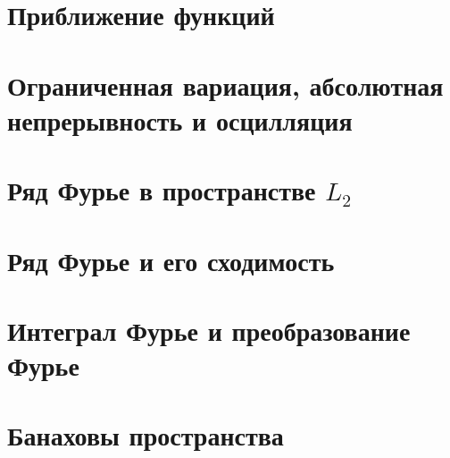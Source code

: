 \section{Приближение функций}



\section{Ограниченная вариация, абсолютная непрерывность и осцилляция}



\section{Ряд Фурье в пространстве \texorpdfstring{$L_2$}{L2}}



\section{Ряд Фурье и его сходимость}



\section{Интеграл Фурье и преобразование Фурье}



\section{Банаховы пространства}
